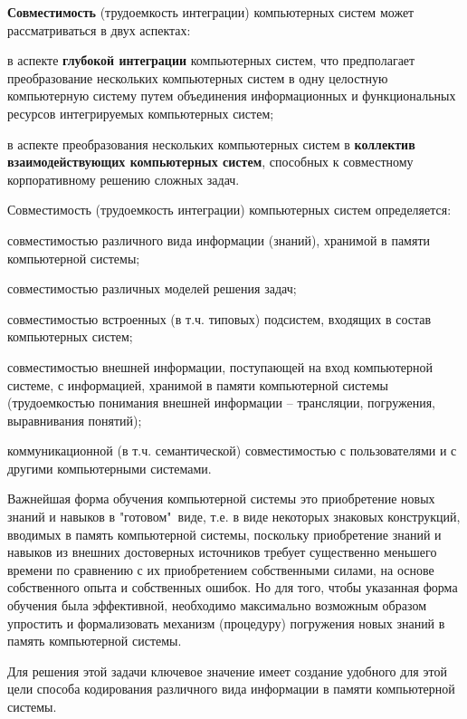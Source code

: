 \begin{SCn}
{\textbf{Совместимость} (трудоемкость интеграции) компьютерных систем может рассматриваться в двух аспектах:

\begin{scnitemize}
    \item в аспекте \textbf{глубокой интеграции} компьютерных систем, что предполагает преобразование нескольких компьютерных систем в одну целостную компьютерную систему путем объединения информационных и функциональных ресурсов интегрируемых компьютерных систем;
    \item в аспекте преобразования нескольких компьютерных систем в \textbf{коллектив взаимодействующих компьютерных систем}, способных к совместному корпоративному решению сложных задач.
\end{scnitemize}

Совместимость (трудоемкость интеграции) компьютерных систем определяется:
\begin{scnitemize}
    \item совместимостью различного вида информации (знаний), хранимой в памяти компьютерной системы;
    \item совместимостью различных моделей решения задач;
    \item совместимостью встроенных (в т.ч. типовых) подсистем, входящих в состав компьютерных систем;
    \item совместимостью внешней информации, поступающей на вход компьютерной системе, с информацией, хранимой в памяти компьютерной системы (трудоемкостью понимания внешней информации -- трансляции, погружения, выравнивания понятий);
    \item коммуникационной (в т.ч. семантической) совместимостью с пользователями и с другими компьютерными системами.
\end{scnitemize}

Важнейшая форма обучения компьютерной системы это приобретение новых знаний и навыков в "готовом"\ виде, т.е. в виде некоторых знаковых конструкций, вводимых в память компьютерной системы, поскольку приобретение знаний и навыков из внешних достоверных источников требует существенно меньшего времени по сравнению с их приобретением собственными силами, на основе собственного опыта и собственных ошибок. Но для того, чтобы указанная форма обучения была эффективной, необходимо максимально возможным образом упростить и формализовать механизм (процедуру) погружения новых знаний в память компьютерной системы.

Для решения этой задачи ключевое значение имеет создание удобного для этой цели способа кодирования различного вида информации в памяти компьютерной системы.

}
\end{SCn}
